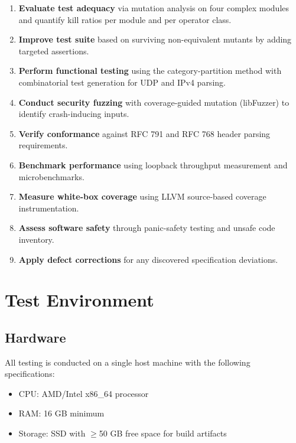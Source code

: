 \documentclass[11pt,a4paper]{article}
\begin{document}
\begin{enumerate}[noitemsep]
\item \textbf{Evaluate test adequacy} via mutation analysis on four complex modules and quantify kill ratios per module and per operator class.
\item \textbf{Improve test suite} based on surviving non-equivalent mutants by adding targeted assertions.
\item \textbf{Perform functional testing} using the category-partition method with combinatorial test generation for UDP and IPv4 parsing.
\item \textbf{Conduct security fuzzing} with coverage-guided mutation (libFuzzer) to identify crash-inducing inputs.
\item \textbf{Verify conformance} against RFC 791 and RFC 768 header parsing requirements.
\item \textbf{Benchmark performance} using loopback throughput measurement and microbenchmarks.
\item \textbf{Measure white-box coverage} using LLVM source-based coverage instrumentation.
\item \textbf{Assess software safety} through panic-safety testing and unsafe code inventory.
\item \textbf{Apply defect corrections} for any discovered specification deviations.

\end{enumerate}

\section{Test Environment}

\subsection{Hardware}

All testing is conducted on a single host machine with the following specifications:
\begin{itemize}[noitemsep]
\item CPU: AMD/Intel x86\_64 processor
\item RAM: 16 GB minimum
\item Storage: SSD with $\geq$50 GB free space for build artifacts
\end{itemize}
\end{document}
